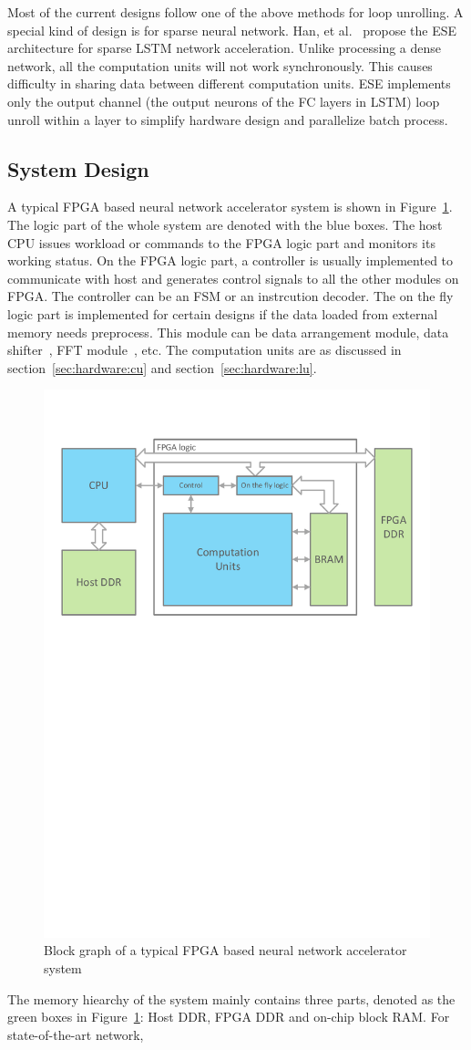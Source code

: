 Most of the current designs follow one of the above methods for loop unrolling. A special kind of design is for sparse neural network. Han, et al.~\cite{han2017ese} propose the ESE architecture for sparse LSTM network acceleration. Unlike processing a dense network, all the computation units will not work synchronously. This causes difficulty in sharing data between different computation units. ESE implements only the output channel (the output neurons of the FC layers in LSTM) loop unroll within a layer to simplify hardware design and parallelize batch process.

\subsection{System Design}

A typical FPGA based neural network accelerator system is shown in Figure~\ref{fig:sys}. The logic part of the whole system are denoted with the blue boxes. The host CPU issues workload or commands to the FPGA logic part and monitors its working status. On the FPGA logic part, a controller is usually implemented to communicate with host and generates control signals to all the other modules on FPGA. The controller can be an FSM or an instrcution decoder. The on the fly logic part is implemented for certain designs if the data loaded from external memory needs preprocess. This module can be data arrangement module, data shifter~\cite{qiu2016going}, FFT module~\cite{zhang2017frequency}, etc. The computation units are as discussed in section~\ref{sec:hardware:cu} and section~\ref{sec:hardware:lu}.

\begin{figure}[t]
    \centering
    \includegraphics[width=0.8\columnwidth]{fig/sys.pdf}
    \caption{Block graph of a typical FPGA based neural network accelerator system}
    \label{fig:sys}
\end{figure}

The memory hiearchy of the system mainly contains three parts, denoted as the green boxes in Figure~\ref{fig:sys}: Host DDR, FPGA DDR and on-chip block RAM. For state-of-the-art network, 

